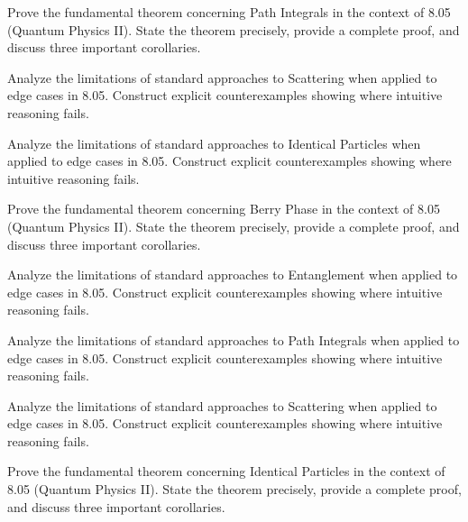 \documentclass[12pt,a4paper]{exam}
\begin{document}
\begin{questions}

\question[5]
Prove the fundamental theorem concerning Path Integrals in the context of 8.05 (Quantum Physics II). State the theorem precisely, provide a complete proof, and discuss three important corollaries.

\vspace{0.3cm}

\question[5]
Analyze the limitations of standard approaches to Scattering when applied to edge cases in 8.05. Construct explicit counterexamples showing where intuitive reasoning fails.

\vspace{0.3cm}

\question[4]
Analyze the limitations of standard approaches to Identical Particles when applied to edge cases in 8.05. Construct explicit counterexamples showing where intuitive reasoning fails.

\vspace{0.3cm}

\question[3]
Prove the fundamental theorem concerning Berry Phase in the context of 8.05 (Quantum Physics II). State the theorem precisely, provide a complete proof, and discuss three important corollaries.

\vspace{0.3cm}

\question[4]
Analyze the limitations of standard approaches to Entanglement when applied to edge cases in 8.05. Construct explicit counterexamples showing where intuitive reasoning fails.

\vspace{0.3cm}

\question[5]
Analyze the limitations of standard approaches to Path Integrals when applied to edge cases in 8.05. Construct explicit counterexamples showing where intuitive reasoning fails.

\vspace{0.3cm}

\question[8]
Analyze the limitations of standard approaches to Scattering when applied to edge cases in 8.05. Construct explicit counterexamples showing where intuitive reasoning fails.

\vspace{0.3cm}

\question[2]
Prove the fundamental theorem concerning Identical Particles in the context of 8.05 (Quantum Physics II). State the theorem precisely, provide a complete proof, and discuss three important corollaries.


\end{questions}
\end{document}
